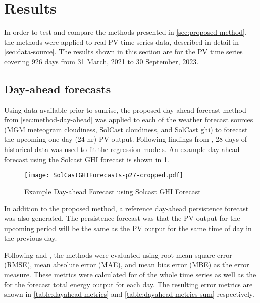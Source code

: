 \section{Results}
\label{sec:results}

In order to test and compare the methods presented in \cref{sec:proposed-method},
the methods were applied to real PV time series data, described in detail in \cref{sec:data-source}.
The results shown in this section are for the PV time series covering
926 days from 31 March, 2021 to 30 September, 2023.

\subsection{Day-ahead forecasts}

Using data available prior to sunrise, the proposed day-ahead forecast method from  \cref{sec:method-day-ahead} was applied to each of the weather forecast sources
(MGM meteogram cloudiness, SolCast cloudiness, and SolCast ghi)
to forecast the upcoming one-day (24 hr) PV output.
Following findings from \cite{Almeida2015},
28 days of historical data was used to fit the regression models.
An example day-ahead forecast using the Solcast GHI forecast is shown in \cref{fig:dayahead-forecast-solcast}. %

\begin{figure}[!ht]
	\centering
	\texttt{[image: SolCastGHIForecasts-p27-cropped.pdf]}
	\caption{Example Day-ahead Forecast using Solcast GHI Forecast}
	\label{fig:dayahead-forecast-solcast}
\end{figure}

In addition to the proposed method, a reference day-ahead persistence forecast was also generated.
The persistence forecast was that the PV output for the upcoming period will be the same as the PV output for the same time of day in the previous day.

Following \cite{Pedro2012} and \cite{Gigoni2018}, the methods were evaluated using root mean square error (RMSE), mean absolute error (MAE), and mean bias error (MBE) as the error measure.
These metrics were calculated for of the whole time series as well as the for the forecast total energy output for each day.
The resulting error metrics are shown in \cref{table:dayahead-metrics} and \cref{table:dayahead-metrics-sum} respectively.

